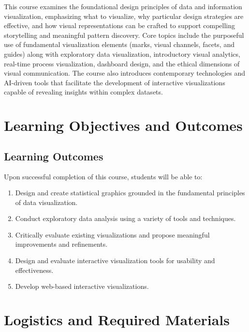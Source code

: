 \documentclass[
]{article}
\begin{document}
This course examines the foundational design principles of data and
information visualization, emphasizing what to visualize, why particular
design strategies are effective, and how visual representations can be
crafted to support compelling storytelling and meaningful pattern
discovery. Core topics include the purposeful use of fundamental
visualization elements (marks, visual channels, facets, and guides)
along with exploratory data visualization, introductory visual
analytics, real-time process visualization, dashboard design, and the
ethical dimensions of visual communication. The course also introduces
contemporary technologies and AI-driven tools that facilitate the
development of interactive visualizations capable of revealing insights
within complex datasets.

\hypertarget{learning-objectives-and-outcomes}{%
\section{Learning Objectives and
Outcomes}\label{learning-objectives-and-outcomes}}

\hypertarget{learning-outcomes}{%
\subsection{\texorpdfstring{\textbf{Learning
Outcomes}}{Learning Outcomes}}\label{learning-outcomes}}

Upon successful completion of this course, students will be able to:

\begin{enumerate}
\def\labelenumi{\arabic{enumi}.}
\item
  Design and create statistical graphics grounded in the fundamental
  principles of data visualization.
\item
  Conduct exploratory data analysis using a variety of tools and
  techniques.
\item
  Critically evaluate existing visualizations and propose meaningful
  improvements and refinements.
\item
  Design and evaluate interactive visualization tools for usability and
  effectiveness.
\item
  Develop web-based interactive visualizations.
\end{enumerate}

\hypertarget{logistics-and-required-materials}{%
\section{Logistics and Required
Materials}\label{logistics-and-required-materials}}
\end{document}

